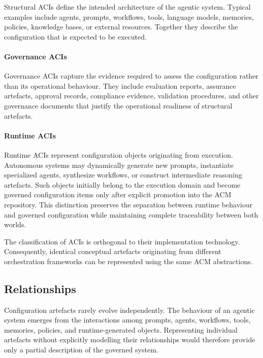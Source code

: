 \documentclass[10pt]{article}
\begin{document}
Structural ACIs define the intended architecture of the agentic system. Typical examples include agents, prompts, workflows, tools, language models, memories, policies, knowledge bases, or external resources. Together they describe the configuration that is expected to be executed.

\paragraph{Governance ACIs}

Governance ACIs capture the evidence required to assess the configuration rather than its operational behaviour. They include evaluation reports, assurance artefacts, approval records, compliance evidence, validation procedures, and other governance documents that justify the operational readiness of structural artefacts.

\paragraph{Runtime ACIs}

Runtime ACIs represent configuration objects originating from execution. Autonomous systems may dynamically generate new prompts, instantiate specialized agents, synthesize workflows, or construct intermediate reasoning artefacts. Such objects initially belong to the execution domain and become governed configuration items only after explicit promotion into the ACM repository. This distinction preserves the separation between runtime behaviour and governed configuration while maintaining complete traceability between both worlds.

The classification of ACIs is orthogonal to their implementation technology. Consequently, identical conceptual artefacts originating from different orchestration frameworks can be represented using the same ACM abstractions.

\subsection{Relationships}
\label{sec:relationships}

Configuration artefacts rarely evolve independently. The behaviour of an agentic system emerges from the interactions among prompts, agents, workflows, tools, memories, policies, and runtime-generated objects. Representing individual artefacts without explicitly modelling their relationships would therefore provide only a partial description of the governed system.
\end{document}
